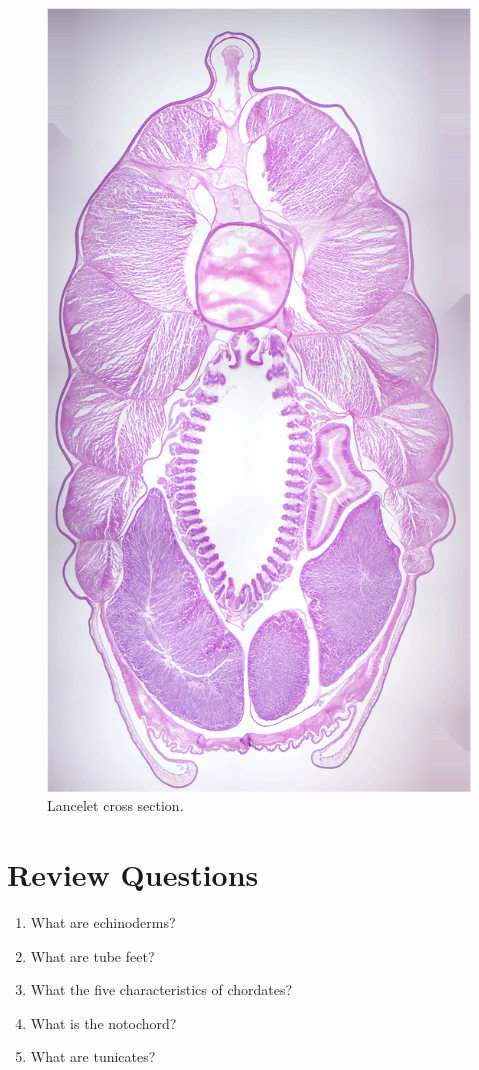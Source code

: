 \begin{figure}

{\centering \includegraphics[width=0.7\linewidth]{./figures/echinodermata/lancelet_xs}

}

\caption{Lancelet cross section.}\label{fig:lanceletxs}
\end{figure}

\section{Review Questions}\label{review-questions-6}

\begin{enumerate}
\def\labelenumi{\arabic{enumi}.}
\tightlist
\item
  What are echinoderms?
\item
  What are tube feet?
\item
  What the five characteristics of chordates?
\item
  What is the notochord?
\item
  What are tunicates?
\end{enumerate}
